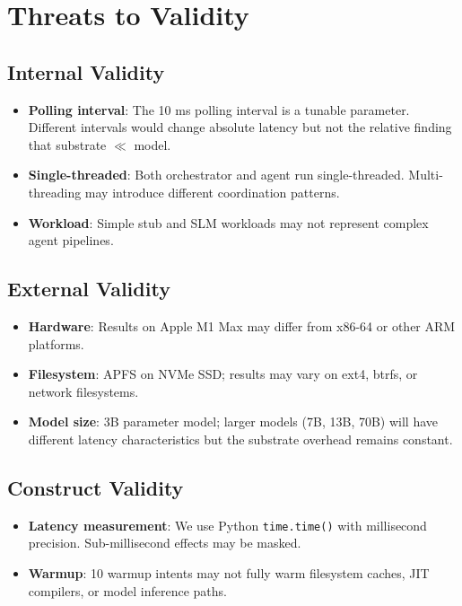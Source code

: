 \documentclass[11pt]{article}
\begin{document}
\section{Threats to Validity}

\subsection{Internal Validity}

\begin{itemize}
\item \textbf{Polling interval}: The 10 ms polling interval is a tunable parameter. Different intervals would change absolute latency but not the relative finding that substrate $\ll$ model.
\item \textbf{Single-threaded}: Both orchestrator and agent run single-threaded. Multi-threading may introduce different coordination patterns.
\item \textbf{Workload}: Simple stub and SLM workloads may not represent complex agent pipelines.
\end{itemize}

\subsection{External Validity}

\begin{itemize}
\item \textbf{Hardware}: Results on Apple M1 Max may differ from x86-64 or other ARM platforms.
\item \textbf{Filesystem}: APFS on NVMe SSD; results may vary on ext4, btrfs, or network filesystems.
\item \textbf{Model size}: 3B parameter model; larger models (7B, 13B, 70B) will have different latency characteristics but the substrate overhead remains constant.
\end{itemize}

\subsection{Construct Validity}

\begin{itemize}
\item \textbf{Latency measurement}: We use Python \texttt{time.time()} with millisecond precision. Sub-millisecond effects may be masked.
\item \textbf{Warmup}: 10 warmup intents may not fully warm filesystem caches, JIT compilers, or model inference paths.
\end{itemize}
\end{document}
